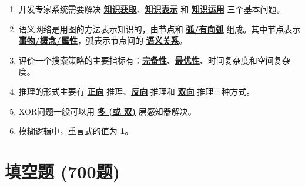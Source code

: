 \documentclass[12pt,a4paper,openany]{ctexbook}
\begin{document}
\begin{enumerate}[leftmargin=2em,itemsep=1em]
\item 开发专家系统需要解决 \underline{\textbf{知识获取}}、\underline{\textbf{知识表示}} 和 \underline{\textbf{知识运用}} 三个基本问题。

\item 语义网络是用图的方法表示知识的，由节点和 \underline{\textbf{弧/有向弧}} 组成。其中节点表示 \underline{\textbf{事物/概念/属性}}，弧表示节点间的 \underline{\textbf{语义关系}}。

\item 评价一个搜索策略的主要指标有：\underline{\textbf{完备性}}、\underline{\textbf{最优性}}、时间复杂度和空间复杂度。

\item 推理的形式主要有 \underline{\textbf{正向}} 推理、\underline{\textbf{反向}} 推理和 \underline{\textbf{双向}} 推理三种方式。

\item XOR问题一般可以用 \underline{\textbf{多 (或 双)}} 层感知器解决。

\item 模糊逻辑中，重言式的值为 \underline{\textbf{1}}。

\end{enumerate}

\section{填空题 (700题)}
\end{document}
